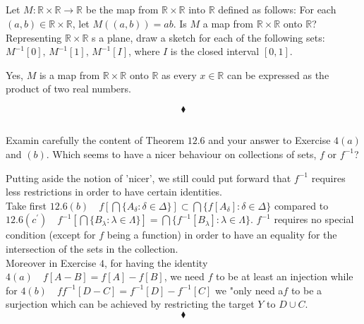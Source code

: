 \subsection{}
\begin{tcolorbox}
Let $M:\mathbb{R}\times\mathbb{R}\rightarrow \mathbb{R}$ be the map from $\mathbb{R}\times\mathbb{R}$ into $\mathbb{R}$ defined as follows: For each $(a,b)\in \mathbb{R}\times\mathbb{R}$, let $M\left((a,b)\right)=ab$. Is $M$ a map from $\mathbb{R}\times\mathbb{R}$ onto $\mathbb{R}$? Representing $\mathbb{R}\times\mathbb{R}$ s a plane, draw a sketch for each of the following sets: $M^{-1}[0],\,M^{-1}[1],\, M^{-1}[I]$, where $I$ is the closed interval $[0,1]$. 
\end{tcolorbox}
Yes, $M$ is a map from $\mathbb{R}\times\mathbb{R}$ onto $\mathbb{R}$ as every $x\in\mathbb{R}$ can be expressed as the product of two real numbers.
\begin{figure}[H]%
    \centering
\label{fig:fig_p8b}
\end{figure}
$$\blacklozenge$$

\subsection{}
\begin{tcolorbox}
Examin carefully the content of Theorem $\mathbf{12.6}$ and your answer to Exercise $4(a)$ and $(b)$. Which seems to have a nicer behaviour on collections of sets, $f$ or $f^{-1}$?
\end{tcolorbox}
Putting aside the notion of 'nicer', we still could put forward that $f^{-1}$ requires less restrictions in order to have certain identities. \\
Take first $\mathbf{12.6}(b)\quad f\left[\bigcap\{A_{\delta}:\delta \in \Delta\}\right]\subset \bigcap\{f[A_{\delta}]:\delta \in \Delta\}$ compared to $\mathbf{12.6}(c^{'})\quad f^{-1}\left[\bigcap\{B_{\lambda}:\lambda \in \Lambda\}\right]= \bigcap\{f^{-1}[B_{\lambda}]:\lambda \in \Lambda\}$. $f^{-1}$ requires no special condition (except for $f$ being a function) in order to have an equality for the intersection of the sets in the collection.\\
Moreover in Exercise $4$, for having the identity $4(a)\quad f[A-B] = f[A]-f[B]$, we need $f$ to be at least an injection while for $4(b)\quad ff^{-1}[D-C] = f^{-1}[D]-f^{-1}[C]$ we "only need a$f$ to be a surjection which can be achieved by  restricting the target $Y$ to $D\cup C$.
$$\blacklozenge$$
